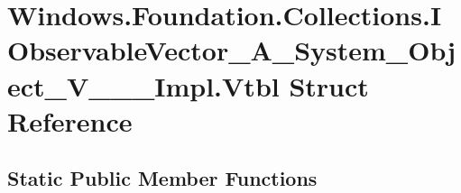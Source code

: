 \hypertarget{struct_windows_1_1_foundation_1_1_collections_1_1_i_observable_vector___a___system___object___v_______impl_1_1_vtbl}{}\section{Windows.\+Foundation.\+Collections.\+I\+Observable\+Vector\+\_\+\+A\+\_\+\+System\+\_\+\+Object\+\_\+\+V\+\_\+\+\_\+\+\_\+\+Impl.\+Vtbl Struct Reference}
\label{struct_windows_1_1_foundation_1_1_collections_1_1_i_observable_vector___a___system___object___v_______impl_1_1_vtbl}
\subsection*{Static Public Member Functions}
